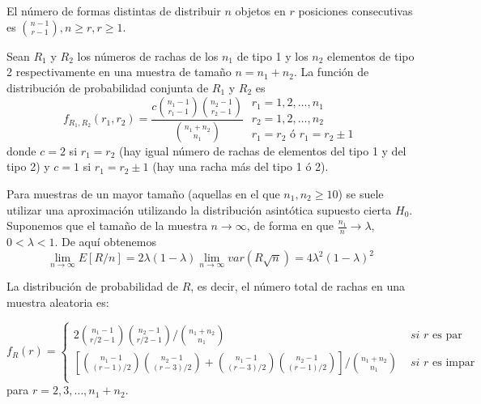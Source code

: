 \begin{lema} 
	El número de formas distintas de distribuir $n$ objetos 
en $r$ posiciones consecutivas es ${n-1 \choose r-1}, n \geq 
r, r \geq 1$.
\end{lema}

\begin{teorema}
	Sean $R_1$ y $R_2$ los números de rachas de los $n_1$ de 
tipo 1 y los $n_2$ elementos de tipo 2 respectivamente en una 
muestra de tamaño $n = n_1 + n_2$. La función de distribución 
de probabilidad conjunta de $R_1$ y $R_2$ es
	\[ f_{R_1,R_2} (r_1, r_2) = 
		\frac{c {n_1 - 1 \choose r_1 - 1} 
				{n_2 - 1 \choose r_2 - 1}}
			{{n_1 + n_2 \choose n_1}}\;
		\begin{array}{l}
			r_1 = 1,2, \dots, n_1 \\
			r_2 = 1,2, \dots, n_2 \\
			r_1 = r_2 \text{ ó } r_1 = r_2 \pm 1
		\end{array}
	\]
	donde $c=2$ si $r_1 = r_2$ (hay igual número de rachas de 
elementos del tipo 1 y del tipo 2) y $c=1$ si $r_1 = 
r_2 \pm 1$ (hay una racha más del tipo 1 ó 2).
\end{teorema}

	Para muestras de un mayor tamaño (aquellas en el que 
$n_1, n_2 \geq 10$) se suele utilizar una aproximación 
utilizando la distribución asintótica supuesto cierta 
$H_0$.\\
	Suponemos que el tamaño de la muestra $n \rightarrow 
\infty$, de forma en que $\frac{n_1}{n} \rightarrow \lambda$, 
$0<\lambda<1$. De aquí obtenemos
	\[ \underset{n \rightarrow \infty}{\lim} E[R/n] = 
			2\lambda (1-\lambda) 
				\underset{n \rightarrow \infty}{\lim} 
					var(R\sqrt{n}) =
			4\lambda^2(1-\lambda)^2
	\]
	
\begin{teorema}
	La distribución de probabilidad de $R$, es decir, el 
número total de rachas en una muestra aleatoria es:
	
	\begin{equation}
		f_R(r) = \left\lbrace\begin{array}{ll}
	2 {n_1-1 \choose r/2-1} {n_2-1 \choose r/2-1} 
		\big/ {n_1 + n_2 \choose n_1} &
			\textit{ si } r \text{ es par} \\
	\left[
		{n_1-1 \choose (r-1)/2} {n_2-1 \choose (r-3)/2} +  
		{n_1-1 \choose (r-3)/2} {n_2-1 \choose (r-1)/2} 
	\right]
		\big/ {n_1 + n_2 \choose n_1} &
			\textit{ si } r \text{ es impar} \\		
		\end{array}\right.
	\label{th-dist-R}
	\end{equation}
	para $r=2, 3, \dots, n_1 + n_2.$
\end{teorema}
	
